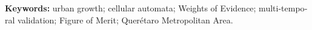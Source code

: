 \begin{otherlanguage}{english}
%
%
%

\vspace{0.3cm}
\noindent\textbf{Keywords:} urban growth; cellular automata; Weights of
Evidence; multi-temporal validation; Figure of Merit; Querétaro Metropolitan
Area.
\end{otherlanguage}
\cleardoublepage
